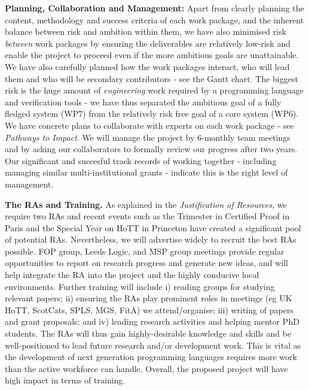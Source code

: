 \documentclass[a4paper,11pt]{article}
\begin{document}

{\bf Planning, Collaboration and Management:} Apart from clearly
planning the content, methodology and success criteria of each work package, and the inherent balance between risk and ambition
within them, we have also minimised risk {\em between} work packages
by ensuring the deliverables are relatively low-risk and
enable the project to proceed even if the
more ambitious goals are unattainable. We have also carefully planned how the work
packages interact, who will lead them and who will be secondary
contributors - see the Gantt chart. The biggest risk is the huge
amount of {\em engineering} work required by a programming language
and verification tools - we have thus separated the ambitious
goal of a fully fledged system (WP7) from the relatively risk free
goal of a core system (WP6). We have concrete plans to collaborate
with experts on each work package - see {\em Pathways to Impact}. We
will manage the project by 6-monthly team meetings and by asking our
collaborators to formally review our progress after two years.  Our
significant and succesful track records of working together -
including managing similar multi-institutional grants - indicate
this is the right level of management.


{\bf The RAs and Training.} As explained in the {\em
  Justification of Resources}, we require two RAs and recent events
such as the Trimester in Certified Proof in Paris and the Special Year
on HoTT in Princeton have created a significant pool of potential
RAs. Nevertheless, we will advertise widely to recruit the best RAs
possible.  FOP group, Leeds Logic, and MSP group meetings provide
regular opportunities to report on research progress and generate new
ideas, and will help integrate the RA into the project and the highly
conducive local environments. Further training will include i) reading
groups for studying relevant papers; ii) ensuring the RAs play
prominent roles in meetings (eg UK HoTT, ScotCats, SPLS, MGS, FitA) we
attend/organise; iii) writing of papers and grant proposals; and
iv) leading research activities and helping mentor PhD students.
The RAs will thus gain highly-desirable
knowledge and skills and be well-positioned to lead future research
and/or development work. This is vital as the development of
next generation programming languages requires more work than the
active workforce can handle. Overall, the proposed project will have
high impact in terms of training.
\end{document}
